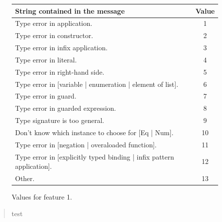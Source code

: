 \documentclass[12pt]{report}	%
\begin{document}
\begin{figure}
\centering
\begin{tabular}{l | c }
\toprule
String contained in the message & Value \\
\midrule
Type error in application. & 1\\
Type error in constructor. & 2\\
Type error in infix application. & 3 \\
Type error in literal.  & 4\\
Type error in right-hand side. & 5 \\
Type error in [variable | enumeration | element of list]. & 6 \\
Type error in guard. & 7 \\
Type error in guarded expression. & 8 \\
Type signature is too general. & 9 \\
Don't know which instance to choose for [Eq | Num]. & 10 \\
Type error in [negation | overaloaded function]. & 11 \\
Type error in [explicitly typed binding | infix pattern application]. & 12 \\
Other. & 13 \\
\bottomrule
\end{tabular}
\caption{Values for feature 1.}
\label{fig:heliummsg}
\end{figure}

%
%
%

%
%


                      
%


%
% 
%
\printindex     %
%

\begin{abstract}
test
\end{abstract}
\end{document}
